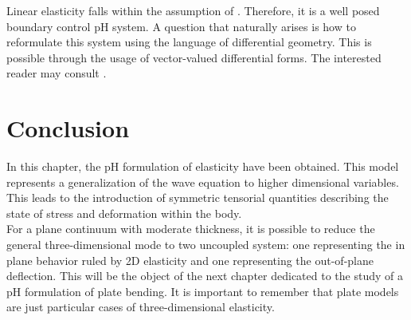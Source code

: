 Linear elasticity falls within the assumption of \cite{skrepek2019wellposedness}. Therefore, it is a well posed boundary control pH system. A question that naturally arises is how to reformulate this system using the language of differential geometry. This is possible through the usage of vector-valued differential forms. The interested reader may consult \cite{brezzi2008mixed}.

\section{Conclusion}
In this chapter, the pH formulation of elasticity have been obtained. This model represents a generalization of the wave equation to higher dimensional variables. This leads to the introduction of symmetric tensorial quantities describing the state of stress and deformation within the body.  \\
For a plane continuum with moderate thickness, it is possible to
reduce the general three-dimensional mode to two uncoupled system: one representing the in plane behavior ruled by 2D elasticity and one representing the out-of-plane deflection. This will be the object of the next chapter dedicated to the study of a pH formulation of plate bending. It is important to remember that plate models are just particular cases of three-dimensional elasticity.



